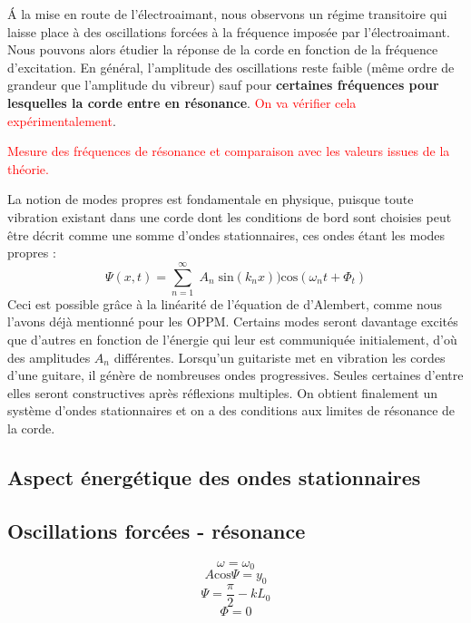 \documentclass[11pt,a4paper]{report}
\begin{document}
\'A la mise en route de l'électroaimant, nous observons un régime transitoire qui laisse place à des oscillations forcées à la fréquence imposée par l'électroaimant. Nous pouvons alors étudier la réponse de la corde en fonction de la fréquence d'excitation. En général, l'amplitude des oscillations reste faible (même ordre de grandeur que l'amplitude du vibreur) sauf pour \textbf{certaines fréquences pour lesquelles la corde entre en résonance}. \textcolor{red}{On va vérifier cela expérimentalement}.

\textcolor{red}{Mesure des fréquences de résonance et comparaison avec les valeurs issues de la théorie.}

La notion de modes propres est fondamentale en physique, puisque toute vibration existant dans une corde dont les conditions de bord sont choisies peut être décrit comme une somme d'ondes stationnaires, ces ondes étant les modes propres :
\begin{equation}
	\Psi(x,t) = \sum_{n = 1}^{\infty}\;A_n\;\text{sin}(k_n x))\text{cos}(\omega_n t + \Phi_t)
\end{equation}
Ceci est possible grâce à la linéarité de l'équation de d'Alembert, comme nous l'avons déjà mentionné pour les OPPM. Certains modes seront davantage excités que d'autres en fonction de l'énergie qui leur est communiquée initialement, d'où des amplitudes $A_n$ différentes. Lorsqu'un guitariste met en vibration les cordes d'une guitare, il génère de nombreuses ondes progressives. Seules certaines d'entre elles seront constructives après réflexions multiples. On obtient finalement un système d'ondes stationnaires et on a des conditions aux limites de résonance de la corde.\\


\subsection{Aspect énergétique des ondes stationnaires}

\subsection{Oscillations forcées - résonance}

%
%
%
\begin{equation}
	\omega = \omega_0
\end{equation}
\begin{equation}
	A\text{cos}\Psi = y_0
\end{equation}
\begin{equation}
	\Psi = \frac{\pi}{2} - k L_0
\end{equation}
\begin{equation}
	\Phi = 0
\end{equation}
\end{document}
